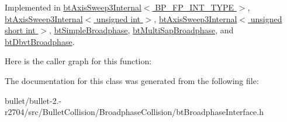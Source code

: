 Implemented in \hyperlink{classbt_axis_sweep3_internal_a5f343e29ce818d0b96cb11260bca2a68}{bt\+Axis\+Sweep3\+Internal$<$ B\+P\+\_\+\+F\+P\+\_\+\+I\+N\+T\+\_\+\+T\+Y\+P\+E $>$}, \hyperlink{classbt_axis_sweep3_internal_a5f343e29ce818d0b96cb11260bca2a68}{bt\+Axis\+Sweep3\+Internal$<$ unsigned int $>$}, \hyperlink{classbt_axis_sweep3_internal_a5f343e29ce818d0b96cb11260bca2a68}{bt\+Axis\+Sweep3\+Internal$<$ unsigned short int $>$}, \hyperlink{classbt_simple_broadphase_a8753363773ebbfeb48f8cf5594429dc2}{bt\+Simple\+Broadphase}, \hyperlink{classbt_multi_sap_broadphase_a9aacf91a557db1d79faea2b73b8692b7}{bt\+Multi\+Sap\+Broadphase}, and \hyperlink{structbt_dbvt_broadphase_a32ab55b5ef2616d0cc039cd037c05d7f}{bt\+Dbvt\+Broadphase}.



Here is the caller graph for this function\+:




The documentation for this class was generated from the following file\+:\begin{DoxyCompactItemize}
\item 
bullet/bullet-\/2.-\/r2704/src/\+Bullet\+Collision/\+Broadphase\+Collision/bt\+Broadphase\+Interface.\+h\end{DoxyCompactItemize}
